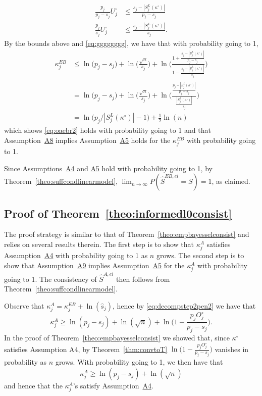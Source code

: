 \documentclass[
  12pt]{article}
\begin{document}
\begin{align}
    \frac{p_j}{p_j-s_j}U^{\circ}_j &\leq \frac{s_j-|S^{L}_j(\kappa^{\circ})|}{p_j-s_j}\nonumber\\
    \frac{p_j}{s_j}U^{\circ}_j &\leq  \frac{s_j-|S^{L}_j(\kappa^{\circ})|}{s_j}. \label{eq:gewou}
\end{align}
By the bounds above and \eqref{eq:gggggggg}, we have that with probability going to 1,
\begin{align*}
  \kappa^{EB}_j 
  &\leq \ln\big(p_j-s_j\big)+\ln\Big(\frac{\sqrt{n}}{s_j}\Big)+\ln\Bigg(\frac{1+\frac{s_j-|S^{L}_j(\kappa^{\circ})|}{p_j-s_j}}{1- \frac{s_j-|S^{L}_j(\kappa^{\circ})|}{s_j}}\Bigg) \nonumber\\
  &= \ln\big(p_j-s_j\big) + \ln\Big(\frac{\sqrt{n}}{s_j}\Big) + \ln\Bigg(\frac{\frac{p_j-|S^{L}_j(\kappa^{\circ})|}{p_j-s_j}}{ \frac{|S^{L}_j(\kappa^{\circ})|}{s_j}}\Bigg) \\
&=\ln\big(p_j/|S^{L}_j(\kappa^{\circ})|-1\big)+\frac{1}{2}\ln(n)\label{eq:finalupperboundkappaj}
\end{align*}
which shows \eqref{eq:oaebr2} holds with probability going to 1 and that
Assumption~\hyperlink{lab:A8}{A8} implies Assumption~\hyperlink{lab:A5}{A5} holds for the $\kappa^{EB}_j$ with probability going to 1. 

Since Assumptions~\hyperlink{lab:A4}{A4} and \hyperlink{lab:A5}{A5} hold with probability going to 1, by Theorem~\ref{theo:suffcondlinearmodel}, $\lim_{n\to\infty}P(\hat{S}^{EB,ei}= S)= 1$, as claimed.

\subsection{Proof of Theorem~\ref{theo:informedl0consist}} The proof strategy is similar to that of Theorem~\ref{theo:empbayesselconsist} and relies on several results therein. The first step is to show that $\kappa^{A}_j$ satisfies Assumption~\hyperlink{lab:A4}{A4} with probability going to 1 as $n$ grows. The second step is to show that Assumption~\hyperlink{lab:A9}{A9} implies Assumption~\hyperlink{lab:A5}{A5} for the $\kappa^{A}_j$ with probability going to 1. The consistency of $\hat S^{A,ei}$ then follows from Theorem~\ref{theo:suffcondlinearmodel}.

Observe that $\kappa_j^{A}=\kappa_j^{EB}+\ln(\widehat s_j)$, hence by \eqref{eq:decompstep2pen2} we have that
\begin{equation*}
    \kappa_j^{A}
    \geq  \ln(p_j-s_j)+\ln(\sqrt{n})+\ln\Big(1-\frac{p_j O^{\circ}_j}{p_j-s_j}\Big).
\end{equation*}
In the proof of Theorem~\ref{theo:empbayesselconsist} we showed that, since $\kappa^{\circ}$ satisfies Assumption A4, by Theorem~\ref{thm:convtoT} $\ln\Big(1-\frac{p_j O^{\circ}_j}{p_j-s_j}\Big)$ vanishes in probability as $n$ grows. With probability going to 1, we then have that
\begin{equation}\label{eq:finallowerboundkappaj2}\kappa^{A}_j 
    \geq  \ln(p_j-s_j)+\ln(\sqrt{n})
\end{equation}
and hence that the $\kappa^{A}_j$'s satisfy Assumption~\hyperlink{lab:A4}{A4}.
\end{document}
